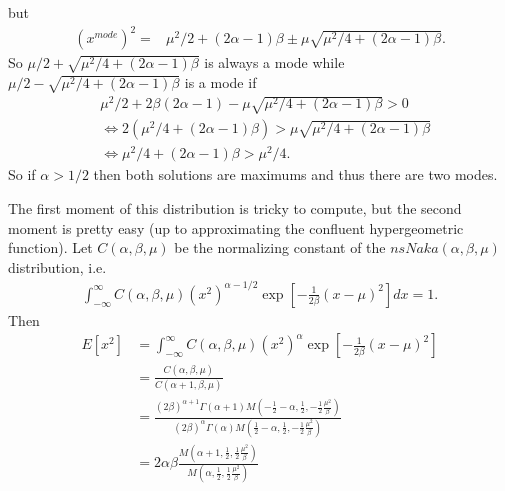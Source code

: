 \documentclass{article}
\begin{document}
but
\begin{align*}
  (x^{mode})^2 = & \mu^2/2 + (2\alpha -1)\beta \pm \mu\sqrt{\mu^2/4 + (2\alpha-1)\beta}.
\end{align*}
So $\mu/2 + \sqrt{\mu^2/4 + (2\alpha -1)\beta}$ is always a mode while $\mu/2 - \sqrt{\mu^2/4 + (2\alpha -1)\beta}$ is a mode if
\begin{align*}
  &\mu^2/2  + 2\beta(2\alpha -1) - \mu\sqrt{\mu^2/4 + (2\alpha-1)\beta} >0\\
  &\iff 2\left(\mu^2/4 + (2\alpha-1)\beta\right)>\mu\sqrt{\mu^2/4 + (2\alpha-1)\beta}\\
  &\iff \mu^2/4 + (2\alpha - 1)\beta > \mu^2/4.
\end{align*}
So if $\alpha>1/2$ then both solutions are maximums and thus there are two modes.

The first moment of this distribution is tricky to compute, but the second moment is pretty easy (up to approximating the confluent hypergeometric function). Let $C(\alpha,\beta,\mu)$ be the normalizing constant of the $nsNaka(\alpha,\beta,\mu)$ distribution, i.e. 
\begin{align*}
  \int_{-\infty}^{\infty}C(\alpha,\beta,\mu)(x^2)^{\alpha-1/2}\exp\left[-\frac{1}{2\beta}(x-\mu)^2\right]dx = 1.
\end{align*}
Then
\begin{align*}
  E[x^2] &= \int_{-\infty}^{\infty}C(\alpha,\beta,\mu)(x^2)^{\alpha}\exp\left[-\frac{1}{2\beta}(x-\mu)^2\right]\\
  &= \frac{C(\alpha,\beta,\mu)}{C(\alpha+1,\beta,\mu)}\\
  & = \frac{(2\beta)^{\alpha+1}\Gamma(\alpha+1)M\left(-\frac{1}{2}-\alpha,\frac{1}{2},-\frac{1}{2}\frac{\mu^2}{\beta}\right)}{(2\beta)^\alpha\Gamma(\alpha)M\left(\frac{1}{2}-\alpha,\frac{1}{2},-\frac{1}{2}\frac{\mu^2}{\beta}\right)}\\
  & = 2\alpha\beta\frac{M\left(\alpha+1,\frac{1}{2},\frac{1}{2}\frac{\mu^2}{\beta}\right)}{M\left(\alpha,\frac{1}{2},\frac{1}{2}\frac{\mu^2}{\beta}\right)}
\end{align*}
\end{document}
